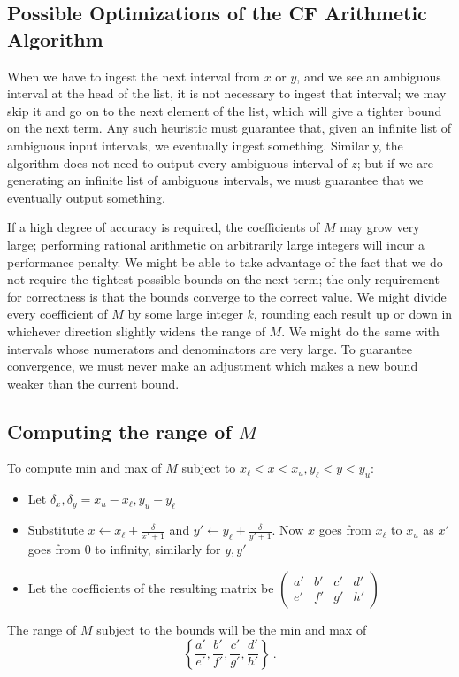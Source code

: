 \documentclass[11pt, oneside]{amsart}   	%
\newcommand{\bihomographic}[8]{\left(\begin{smallmatrix}#1&#2&#3&#4\\#5&#6&#7&#8\end{smallmatrix}\right)}
\begin{document}
\subsection{Possible Optimizations of the CF Arithmetic Algorithm}
When we have to ingest the next interval from $x$ or $y$, and we see an ambiguous interval at the head of the list, it is not necessary to ingest that interval; we may skip it and go on to the next element of the list, which will give a tighter bound on the next term. Any such heuristic must guarantee that, given an infinite list of ambiguous input intervals, we eventually ingest something. Similarly, the algorithm does not need to output every ambiguous interval of $z$; but if we are generating an infinite list of ambiguous intervals, we must guarantee that we eventually output something.

If a high degree of accuracy is required, the coefficients of $M$ may grow very large; performing rational arithmetic on arbitrarily large integers will incur a performance penalty. We might be able to take advantage of the fact that we do not require the tightest possible bounds on the next term; the only requirement for correctness is that the bounds converge to the correct value. We might divide every coefficient of $M$ by some large integer $k$, rounding each result up or down in whichever direction slightly widens the range of $M$. We might do the same with intervals whose numerators and denominators are very large. To guarantee convergence, we must never make an adjustment which makes a new bound weaker than the current bound.


\subsection{Computing the range of $M$}\label{sec:ComputeBounds}
To compute min and max of $M$ subject to $x_{\ell} < x < x_u, y_{\ell} < y < y_u$:
\begin{itemize}
\item Let $\delta_x, \delta_y = x_u - x_{\ell}, y_u - y_{\ell}$
\item Substitute $x \leftarrow x_{\ell} + \frac{\delta}{x'+1}$ and $y' \leftarrow y_{\ell} + \frac{\delta}{y'+1}$. Now $x$ goes from $x_{\ell}$ to $x_u$ as $x'$ goes from 0 to infinity, similarly for $y,y'$
\item Let the coefficients of the resulting matrix be $\bihomographic{a'}{b'}{c'}{d'}{e'}{f'}{g'}{h'}$
\end{itemize}
The range of $M$ subject to the bounds will be the min and max of 
\[
\left\{ \frac{a'}{e'},\frac{b'}{f'},\frac{c'}{g'},\frac{d'}{h'} \right\}\ .
\]
\end{document}
